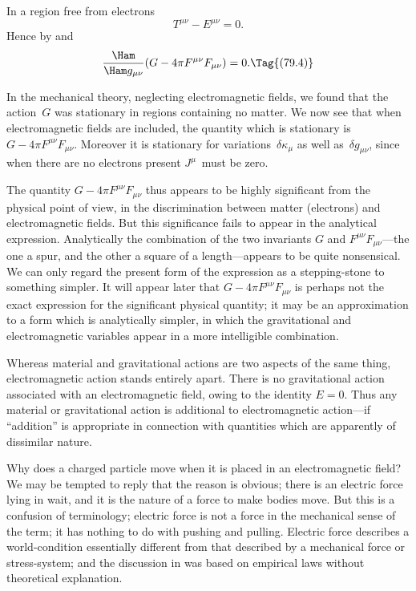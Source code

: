 \documentclass[12pt]{book}
\begin{document}
In a region free from electrons
\[
T^{\mu\nu} - E^{\mu\nu} = 0.
\]
Hence by  and~
\[
\frac{\Ham}{\Ham g_{\mu\nu}} (G - 4\pi F^{\mu\nu} F_{\mu\nu}) = 0.
\Tag{(79.4)}
\]

In the mechanical theory, neglecting electromagnetic fields, we found that
the action~$G$ was stationary in regions containing no matter. We now see
that when electromagnetic fields are included, the quantity which is stationary
is $G - 4\pi F^{\mu\nu} F_{\mu\nu}$. Moreover it is stationary for variations~$\delta\kappa_{\mu}$ as well as~$\delta g_{\mu\nu}$,
since when there are no electrons present $J^{\mu}$~must be zero.

The quantity $G - 4\pi F^{\mu\nu} F_{\mu\nu}$ thus appears to be highly significant from the
physical point of view, in the discrimination between matter (electrons) and
electromagnetic fields. But this significance fails to appear in the analytical
expression. Analytically the combination of the two invariants $G$ and $F^{\mu\nu} F_{\mu\nu}$---the
one a spur, and the other a square of a length---appears to be quite
nonsensical. We can only regard the present form of the expression as a
stepping\hyp{}stone to something simpler. It will appear later that $G - 4\pi F^{\mu\nu} F_{\mu\nu}$
is perhaps not the exact expression for the significant physical quantity; it
may be an approximation to a form which is analytically simpler, in which
the gravitational and electromagnetic variables appear in a more intelligible
combination.

Whereas material and gravitational actions are two aspects of the same
thing, electromagnetic action stands entirely apart. There is no gravitational
action associated with an electromagnetic field, owing to the identity $E = 0$.
Thus any material or gravitational action is additional to electromagnetic
action---if ``addition'' is appropriate in connection with quantities which are
apparently of dissimilar nature.

%
%

Why does a charged particle move when it is placed in an electromagnetic
field? We may be tempted to reply that the reason is obvious; there is an
electric force lying in wait, and it is the nature of a force to make bodies
move. But this is a confusion of terminology; electric force is not a force in
the mechanical sense of the term; it has nothing to do with pushing and
pulling. Electric force describes a world\hyp{}condition essentially different from
that described by a mechanical force or stress\hyp{}system; and the discussion in
 was based on empirical laws without theoretical explanation.
\end{document}
